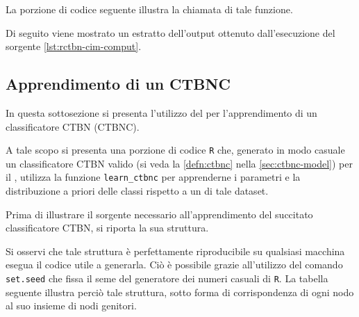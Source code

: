 La porzione di codice seguente illustra la chiamata di tale funzione.

\vspace*{8pt}

Di seguito viene mostrato un estratto dell'output ottenuto dall'esecuzione del sorgente \ref{lst:rctbn-cim-comput}.

\vspace*{8pt}\vspace*{8pt}

\cleardoublepage
\subsection{Apprendimento di un CTBNC}
In questa sottosezione si presenta l'utilizzo del \pacchettor{} per l'apprendimento di un classificatore \acs{CTBN} (\acs{CTBNC}).

A tale scopo si presenta una porzione di codice \lstinline$R$ che, generato in modo casuale un classificatore \acs{CTBN} valido (si veda la \autoref{defn:ctbnc} nella \vref{sec:ctbnc-model}) per il , utilizza la funzione \lstinline[language=rstats]{learn_ctbnc} per apprenderne i parametri e la distribuzione a priori delle classi rispetto a un \emph{} di tale dataset.

Prima di illustrare il sorgente necessario all'apprendimento del succitato classificatore \acs{CTBN}, si riporta la sua struttura.

Si osservi che tale struttura è perfettamente riproducibile su qualsiasi macchina esegua il codice utile a generarla. Ciò è possibile grazie all'utilizzo del comando \lstinline[language=rstats]{set.seed} che fissa il seme del generatore dei numeri casuali di \lstinline$R$. La tabella seguente illustra perciò tale struttura, sotto forma di corrispondenza di ogni nodo al suo insieme di nodi genitori.

